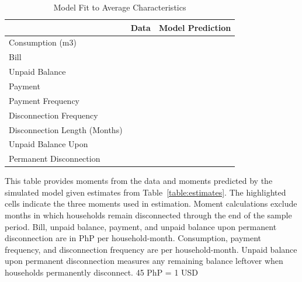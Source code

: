 \documentclass[12pt,table]{article}
\begin{document}
\begin{table}[H]
\centering
\caption{Model Fit to Average Characteristics}\label{table:fit}
\begin{threeparttable}
\begin{tabular}{@{}l*{1}{KK}@{}}
\toprule
 & Data & Model Prediction \\
\midrule
Consumption (m3) &  &   \\
Bill &   &   \\
Unpaid Balance &    &    \\
Payment &   &   \\
Payment Frequency &   &    \\
Disconnection Frequency &    &   \\
Disconnection Length (Months) &  &   \\
Unpaid Balance Upon &   &    \\[-.5em]
Permanent Disconnection \\
\bottomrule
\end{tabular}
\begin{tablenotes}
\item 
\footnotesize
This table provides moments from the data and moments predicted by the simulated model given estimates from Table~\ref{table:estimates}.  The highlighted cells indicate the three moments used in estimation.  Moment calculations exclude months in which households remain disconnected through the end of the sample period.  Bill, unpaid balance, payment, and unpaid balance upon permanent disconnection are in PhP per household-month.  Consumption, payment frequency, and disconnection frequency are per household-month.  Unpaid balance upon permanent disconnection measures any remaining balance leftover when households permanently disconnect.    45 PhP = 1 USD
\end{tablenotes}
\end{threeparttable}

\end{table}
\end{document}
